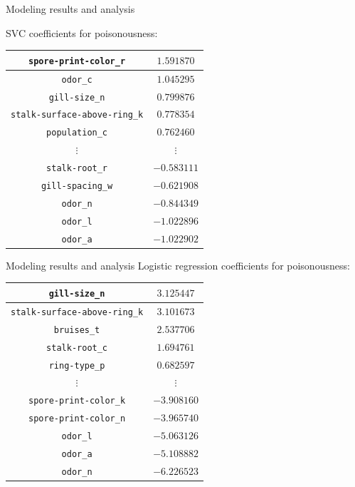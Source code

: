 \documentclass{beamer}
\begin{document}
\begin{frame}{Modeling results and analysis}
\begin{center}
SVC coefficients for poisonousness:
\begin{tabular}{|c|c|}\hline
\texttt{spore-print-color\_r} & $1.591870$ \\\hline
\texttt{odor\_c} & $1.045295$ \\\hline
\texttt{gill-size\_n} & $0.799876$ \\\hline
\texttt{stalk-surface-above-ring\_k} & $0.778354$ \\\hline
\texttt{population\_c} & $0.762460$ \\\hline
$\vdots$ & $\vdots$ \\\hline
\texttt{stalk-root\_r} & $-0.583111$ \\\hline
\texttt{gill-spacing\_w} & $-0.621908$ \\\hline
\texttt{odor\_n} & $-0.844349$ \\\hline
\texttt{odor\_l} & $-1.022896$ \\\hline
\texttt{odor\_a} & $-1.022902$ \\\hline
\end{tabular}
\end{center}
\end{frame}

\begin{frame}{Modeling results and analysis}
Logistic regression coefficients for poisonousness:
\begin{center}
\begin{tabular}{|c|c|}\hline
\texttt{gill-size\_n} & $3.125447$ \\\hline
\texttt{stalk-surface-above-ring\_k} & $3.101673$ \\\hline
\texttt{bruises\_t} & $2.537706$ \\\hline
\texttt{stalk-root\_c} & $1.694761$ \\\hline
\texttt{ring-type\_p} & $0.682597$ \\\hline
$\vdots$ & $\vdots$ \\\hline
\texttt{spore-print-color\_k} & $-3.908160$ \\\hline
\texttt{spore-print-color\_n} & $-3.965740$ \\\hline
\texttt{odor\_l} & $-5.063126$ \\\hline
\texttt{odor\_a} & $-5.108882$ \\\hline
\texttt{odor\_n} & $-6.226523$ \\\hline
\end{tabular}
\end{center}
\end{frame}
\end{document}
